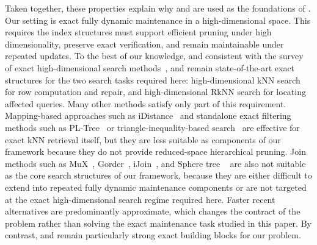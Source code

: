 Taken together, these properties explain why \deltatree and \hdrtree are used as the foundations of \dualtree. Our setting is exact fully dynamic maintenance in a high-dimensional space. This requires the index structures must support efficient pruning under high dimensionality, preserve exact verification, and remain maintainable under repeated updates. To the best of our knowledge, and consistent with the survey of exact high-dimensional search methods~\cite{ukey2023survey}, \deltatree and \hdrtree remain state-of-the-art exact structures for the two search tasks required here: high-dimensional kNN search for row computation and repair, and high-dimensional RkNN search for locating affected queries. Many other methods satisfy only part of this requirement. Mapping-based approaches such as iDistance~\cite{jagadish2005idistance} and standalone exact filtering methods such as PL-Tree~\cite{wang2013pl} or triangle-inequality-based search~\cite{pan2020new} are effective for exact kNN retrieval itself, but they are less suitable as components of our framework because they do not provide reduced-space hierarchical pruning. Join methods such as MuX~\cite{bohm2001cost,bohm2004k}, Gorder~\cite{xia2004gorder}, iJoin~\cite{yu2007efficient}, and Sphere tree ~\cite{yu2010high} are also not suitable as the core search structures of our framework, because they are either difficult to extend into repeated fully dynamic maintenance components or are not targeted at the exact high-dimensional search regime required here. Faster recent alternatives are predominantly approximate, which changes the contract of the problem rather than solving the exact maintenance task studied in this paper. By contrast, \deltatree and \hdrtree remain particularly strong exact building blocks for our problem.
